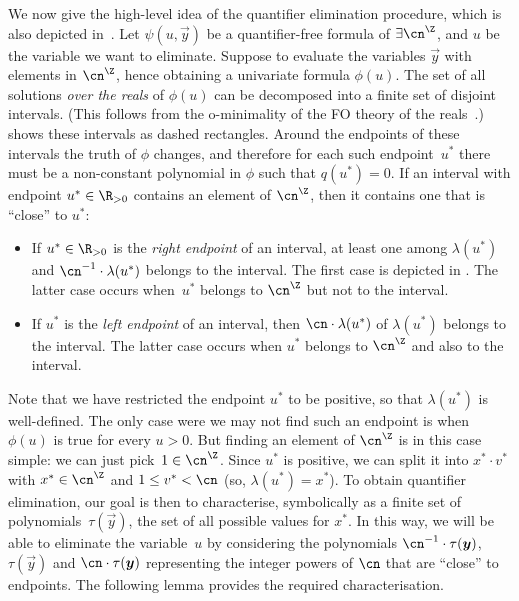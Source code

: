 We now give the high-level idea of the quantifier elimination procedure, which
is also depicted in~. Let $\psi(u,\vec y)$ be a
quantifier-free formula of $\exists\ipow{\cn}$, and $u$ be the variable we
want to eliminate. Suppose to evaluate the variables $\vec y$ with elements in
$\ipow{\cn}$, hence obtaining a univariate formula $\phi(u)$. The set of all
solutions \emph{over the reals} of $\phi(u)$ can be decomposed into a finite set
of disjoint intervals. (This follows from the o-minimality of the FO
theory of the reals~\cite[Chapter~3.3]{marker2002model}.) 
shows these intervals as dashed rectangles. Around the endpoints of these
intervals the truth of $\phi$ changes, and therefore for each such
endpoint~$u^*$ there must be a non-constant polynomial in $\phi$ such that
$q(u^*) = 0$. If an interval with endpoint $u^* \in \R_{>0}$ contains an element
of $\ipow{\cn}$, then it contains one that is ``close'' to $u^*$:
\begin{itemize} 
  \item If $u^* \in \R_{>0}$ is the \emph{right endpoint} of an interval, at
  least one among $\lambda(u^*)$ and $\cn^{-1} \cdot \lambda(u^*)$ belongs to
  the interval. The first case is depicted in . The latter
  case occurs when~$u^*$ belongs to $\ipow{\cn}$ but not to the interval.
  \item If $u^*$ is the \emph{left endpoint} of an interval, then $\cn
  \cdot \lambda(u^*)$ of $\lambda(u^*)$ belongs to the interval.
  The latter case occurs when $u^*$ belongs to $\ipow{\cn}$ and also to the interval.
\end{itemize}
Note that we have restricted the endpoint $u^*$ to be
positive, so that $\lambda(u^*)$ is well-defined. The only case were we may not
find such an endpoint is when $\phi(u)$ is true for every $u > 0$.
But finding an element of $\ipow{\cn}$ is in this case simple: we
can just pick~$1 \in \ipow{\cn}$. Since $u^*$ is positive, we can split it into $x^* \cdot v^*$
with $x^* \in \ipow{\cn}$ and $1 \leq v^* < \cn$ (so, $\lambda(u^*) = x^*$). To
obtain quantifier elimination, our goal is then to characterise, symbolically as
a finite set of polynomials~$\tau(\vec{y})$, the set of all possible values for
$x^*$. In this way, we will be able to eliminate the variable~$u$ by considering the
polynomials $\cn^{-1} \cdot \tau(\vec y)$, $\tau(\vec y)$ and $\cn \cdot \tau(\vec{y})$ representing the
integer powers of $\cn$ that are ``close'' to endpoints. The following lemma
provides the required characterisation.

